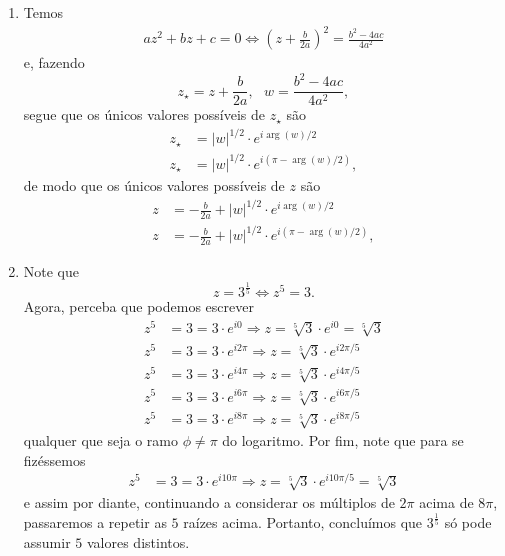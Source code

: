 \documentclass[12pt,a4paper]{article}
\begin{document}
\begin{enumerate}
		\item Temos
		\begin{align*}
		az^2+bz+c=0 \Leftrightarrow \left( z+\frac{b}{2a} \right)^2 = \frac{b^2-4ac}{4a^2}
		\end{align*}
		e, fazendo
		$$
		z_{\star} = z+\frac{b}{2a}, \ \ \ w = \frac{b^2-4ac}{4a^2},
		$$
		segue que os únicos valores possíveis de $z_{\star}$ são
		\begin{align*}
		z_{\star} &= |w|^{1/2}\cdot e^{i\arg(w)/2} \\
		z_{\star} &= |w|^{1/2}\cdot e^{i(\pi-\arg(w)/2)},
		\end{align*}
		de modo que os únicos valores possíveis de $z$ são
		\begin{align*}
		z &= -\frac{b}{2a} + |w|^{1/2}\cdot e^{i\arg(w)/2} \\
		z &= -\frac{b}{2a} + |w|^{1/2}\cdot e^{i(\pi-\arg(w)/2)},
		\end{align*}
		
		\item Note que
		$$
		z = 3^{\frac{1}{5}} \Longleftrightarrow z^5 = 3.
		$$
		Agora, perceba que podemos escrever
		\begin{align*}
		z^5 &= 3 = 3\cdot e^{i0} \Longrightarrow z = \sqrt[5]{3}\cdot e^{i0} = \sqrt[5]{3} \\
		z^5 &= 3 = 3\cdot e^{i2\pi} \Longrightarrow z = \sqrt[5]{3}\cdot e^{i2\pi/5} \\
		z^5 &= 3 = 3\cdot e^{i4\pi} \Longrightarrow z = \sqrt[5]{3}\cdot e^{i4\pi/5} \\
		z^5 &= 3 = 3\cdot e^{i6\pi} \Longrightarrow z = \sqrt[5]{3}\cdot e^{i6\pi/5} \\
		z^5 &= 3 = 3\cdot e^{i8\pi} \Longrightarrow z = \sqrt[5]{3}\cdot e^{i8\pi/5}
		\end{align*}
		qualquer que seja o ramo $\phi\neq \pi$ do logaritmo. Por fim, note que para se fizéssemos
		\begin{align*}
		z^5 &= 3 = 3\cdot e^{i10\pi} \Longrightarrow z = \sqrt[5]{3}\cdot e^{i10\pi/5} = \sqrt[5]{3}
		\end{align*} 
		e assim por diante, continuando a considerar os múltiplos de $2\pi$ acima de $8\pi$, passaremos a repetir as $5$ raízes acima. Portanto, concluímos que $3^{\frac{1}{5}}$ só pode assumir $5$ valores distintos.
		

\end{enumerate}
\end{document}
